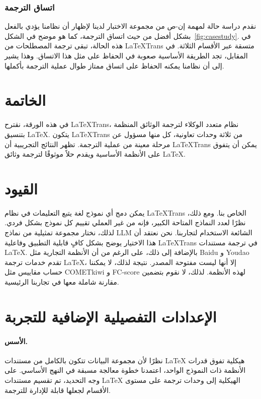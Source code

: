 \documentclass[11pt]{article}
\begin{document}
\subsubsection{اتساق الترجمة}
\label{sec:translation-consistency}
نقدم دراسة حالة لمهمة إن-ص من مجموعة الاختبار لدينا لإظهار أن نظامنا يؤدي بالفعل بشكل أفضل من حيث اتساق الترجمة، كما هو موضح في الشكل~\ref{fig:casestudy}. في هذه الحالة، تبقى ترجمة المصطلحات من LaTeXTrans متسقة عبر الأقسام الثلاثة. في المقابل، تجد الطريقة الأساسية صعوبة في الحفاظ على مثل هذا الاتساق. وهذا يشير إلى أن نظامنا يمكنه الحفاظ على اتساق ممتاز طوال عملية الترجمة بأكملها.

\vspace{-0.1cm}
\section{الخاتمة}
في هذه الورقة، نقترح LaTeXTrans، نظام متعدد الوكلاء لترجمة الوثائق المنظمة بتنسيق LaTeX. يتكون LaTeXTrans من ثلاثة وحدات تعاونية، كل منها مسؤول عن مرحلة معينة من عملية الترجمة. تظهر النتائج التجريبية أن LaTeXTrans يمكن أن يتفوق على الأنظمة الأساسية ويقدم حلاً موثوقًا لترجمة وثائق LaTeX.
\section*{القيود}
يمكن دمج أي نموذج لغة يتبع التعليمات في نظام LaTeXTrans الخاص بنا. ومع ذلك، نظرًا لعدد النماذج المتاحة الكبير، فإنه من غير العملي تقييم كل نموذج بشكل فردي. لذلك، نختار مجموعة تمثيلية من نماذج LLM الشائعة الاستخدام لتجاربنا. نحن نعتقد أن هذا الاختيار يوضح بشكل كافٍ قابلية التطبيق وفاعلية LaTeXTrans في ترجمة مستندات LaTeX. بالإضافة إلى ذلك، على الرغم من أن الأنظمة التجارية مثل Baidu و Youdao تقدم خدمات ترجمة LaTeX، إلا أنها ليست مفتوحة المصدر. نتيجة لذلك، لا يمكننا حساب مقاييس مثل COMETkiwi و FC-score لهذه الأنظمة. لذلك، لا نقوم بتضمين مقارنة شاملة معها في تجاربنا الرئيسية.



\appendix
\clearpage
\section{الإعدادات التفصيلية الإضافية للتجربة}
\label{app:detailed-settings}

\paragraph{الأسس.}
نظرًا لأن مجموعة البيانات تتكون بالكامل من مستندات LaTeX هيكلية تفوق قدرات الأنظمة ذات النموذج الواحد، اعتمدنا خطوة معالجة مسبقة في النهج الأساسي. على وجه التحديد، تم تقسيم مستندات LaTeX الهيكلية إلى وحدات ترجمة على مستوى الأقسام لجعلها قابلة للإدارة للترجمة.
\end{document}
